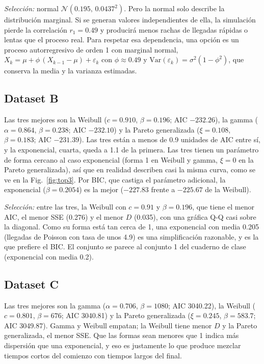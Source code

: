 \documentclass[conference]{IEEEtran}
\begin{document}
\emph{Selección:} normal $\mathcal{N}(0.195,\,0.0437^2)$. Pero la normal solo describe la distribución marginal. Si se generan valores independientes de ella, la simulación pierde la correlación $r_1=0.49$ y producirá menos rachas de llegadas rápidas o lentas que el proceso real. Para respetar esa dependencia, una opción es un proceso autorregresivo de orden 1 con marginal normal, $X_k=\mu+\phi\,(X_{k-1}-\mu)+\varepsilon_k$ con $\phi\approx0.49$ y $\mathrm{Var}(\varepsilon_k)=\sigma^2(1-\phi^2)$, que conserva la media y la varianza estimadas.

\subsection{Dataset B}
Las tres mejores son la Weibull ($c=0.910$, $\beta=0.196$; AIC $-232.26$), la gamma ($\alpha=0.864$, $\beta=0.238$; AIC $-232.10$) y la Pareto generalizada ($\xi=0.108$, $\beta=0.183$; AIC $-231.39$). Las tres están a menos de 0.9 unidades de AIC entre sí, y la exponencial, cuarta, queda a 1.1 de la primera. Las tres tienen un parámetro de forma cercano al caso exponencial (forma 1 en Weibull y gamma, $\xi=0$ en la Pareto generalizada), así que en realidad describen casi la misma curva, como se ve en la Fig.~\ref{fig:top3}. Por BIC, que castiga el parámetro adicional, la exponencial ($\beta=0.2054$) es la mejor ($-227.83$ frente a $-225.67$ de la Weibull).

\emph{Selección:} entre las tres, la Weibull con $c=0.91$ y $\beta=0.196$, que tiene el menor AIC, el menor SSE (0.276) y el menor $D$ (0.035), con una gráfica Q-Q casi sobre la diagonal. Como su forma está tan cerca de 1, una exponencial con media 0.205 (llegadas de Poisson con tasa de unos 4.9) es una simplificación razonable, y es la que prefiere el BIC. El conjunto se parece al conjunto 1 del cuaderno de clase (exponencial con media 0.2).

\subsection{Dataset C}
Las tres mejores son la gamma ($\alpha=0.706$, $\beta=1080$; AIC 3040.22), la Weibull ($c=0.801$, $\beta=676$; AIC 3040.81) y la Pareto generalizada ($\xi=0.245$, $\beta=583.7$; AIC 3049.87). Gamma y Weibull empatan; la Weibull tiene menor $D$ y la Pareto generalizada, el menor SSE. Que las formas sean menores que 1 indica más dispersión que una exponencial, y eso es justamente lo que produce mezclar tiempos cortos del comienzo con tiempos largos del final.
\end{document}
